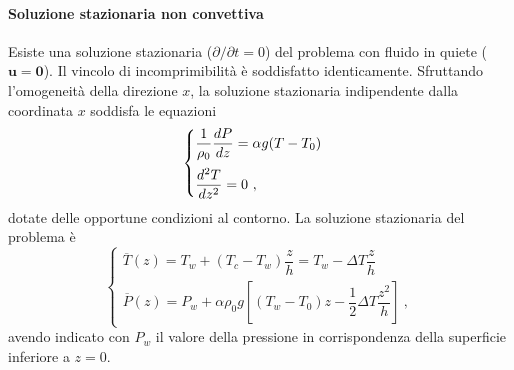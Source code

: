 \paragraph{Soluzione stazionaria non convettiva}
Esiste una soluzione stazionaria ($\partial / \partial t = 0$) del problema con fluido in quiete ($\bm{u} = \bm{0}$).
Il vincolo di incomprimibilità è soddisfatto identicamente. Sfruttando l'omogeneità della direzione $x$, la soluzione stazionaria indipendente dalla coordinata $x$ soddisfa le equazioni
\begin{equation}
    \begin{cases}
        \dfrac{1}{\rho_0}\dfrac{d P}{d z} = \alpha g (T-T_0)  \vspace{0.2cm} \\
        \dfrac{d^2 T}{d z^2} = 0 \ ,
    \end{cases}
\end{equation}
dotate delle opportune condizioni al contorno. La soluzione stazionaria del problema è
\begin{equation}
\begin{cases}
    \overline{T}(z) = T_w + (T_c-T_w) \dfrac{z}{h} =
    T_w - \Delta T \dfrac{z}{h} \\
    \overline{P}(z) = P_w + \alpha \rho_0 g \left[ (T_w-T_0) z
    - \dfrac{1}{2} \Delta T \dfrac{z^2}{h} \right] \ ,
\end{cases}
\end{equation}
avendo indicato con $P_w$ il valore della pressione in corrispondenza della superficie inferiore a $z = 0$.

